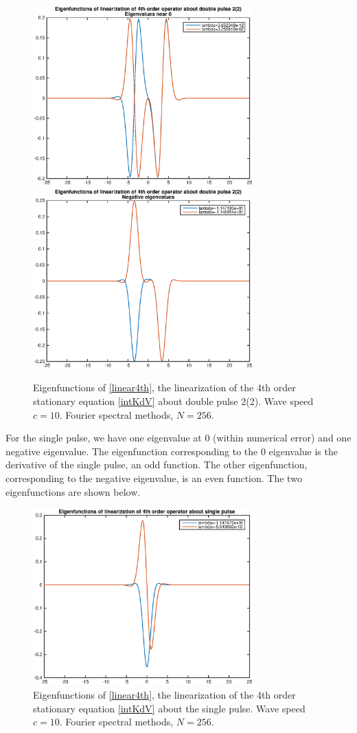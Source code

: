 \documentclass[12pt]{article}
\begin{document}
\begin{figure}[H]
	\includegraphics[width=8.5cm]{four10dp1inteigenfn1}
	\includegraphics[width=8.5cm]{four10dp1inteigenfn2.eps}
	\caption{Eigenfunctions of \eqref{linear4th}, the linearization of the 4th order stationary equation \eqref{intKdV} about double pulse 2(2). Wave speed $c = 10$. Fourier spectral methods, $N = 256$.}
\end{figure}

For the single pulse, we have one eigenvalue at 0 (within numerical error) and one negative eigenvalue. The eigenfunction corresponding to the 0 eigenvalue is the derivative of the single pulse, an odd function. The other eigenfunction, corresponding to the negative eigenvalue, is an even function. The two eigenfunctions are shown below.

\begin{figure}[H]
	\includegraphics[width=8.5cm]{four10singleinteigenfn}
	\caption{Eigenfunctions of \eqref{linear4th}, the linearization of the 4th order stationary equation \eqref{intKdV} about the single pulse. Wave speed $c = 10$. Fourier spectral methods, $N = 256$.}
\end{figure}
\end{document}
